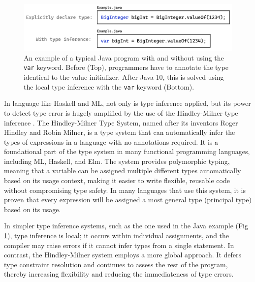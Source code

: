 \begin{figure}[hbt]
\centering  \includegraphics[width=\linewidth]{ExampleJava}
  \caption[An example of a typical Java program with and without using the \texttt{var} keyword]{
    \label{fig:example-java}
      An example of a typical Java program with and without using the \texttt{var} keyword. Before (Top), programmers have to annotate the type identical to the value initializer. After Java 10, this is solved using the local type inference with the \texttt{var} keyword (Bottom).
    }
\end{figure}

In language like Haskell and ML, not only is type inference applied, but its power to detect type error is hugely amplified by the use of the Hindley-Milner type inference  \cite{Damas1982-zw}. The Hindley-Milner Type System, named after its inventors Roger Hindley and Robin Milner, is a type system that can automatically infer the types of expressions in a language with no annotations required. It is a foundational part of the type system in many functional programming languages, including ML, Haskell, and Elm. The system provides polymorphic typing, meaning that a variable can be assigned multiple different types automatically based on its usage context, making it easier to write flexible, reusable code without compromising type safety. In many languages that use this system, it is proven that every expression will be assigned a most general type (principal type) based on its usage. 


In simpler type inference systems, such as the one used in the Java example (Fig \ref{fig:example-java}), type inference is local; it occurs within individual assignments, and the compiler may raise errors if it cannot infer types from a single statement. In contrast, the Hindley-Milner system employs a more global approach. It defers type constraint resolution and continues to assess the rest of the program, thereby increasing flexibility and reducing the immediateness of type errors.




